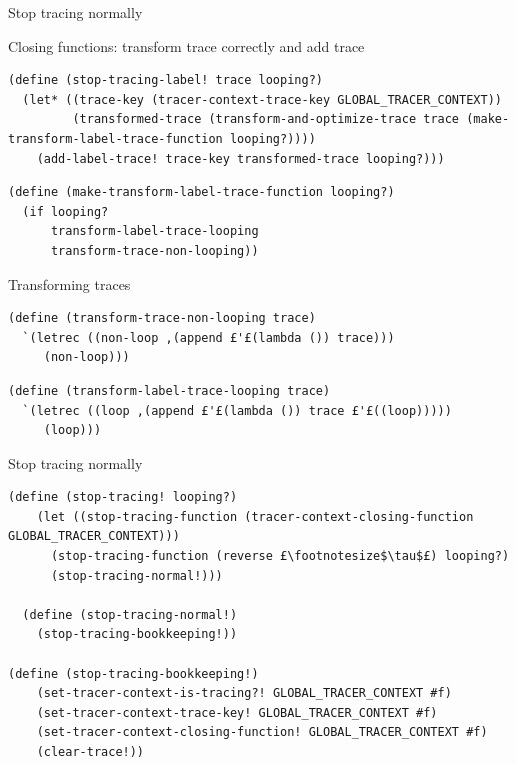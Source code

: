 \documentclass{beamer}
\begin{document}
\begin{frame}[fragile]{Stop tracing normally}

Closing functions: transform trace correctly and add trace

\begin{lstlisting}[basicstyle = \scriptsize\ttfamily, escapechar = £]
(define (stop-tracing-label! trace looping?)
  (let* ((trace-key (tracer-context-trace-key GLOBAL_TRACER_CONTEXT))
         (transformed-trace (transform-and-optimize-trace trace (make-transform-label-trace-function looping?))))
    (add-label-trace! trace-key transformed-trace looping?)))
\end{lstlisting}

\pause

\begin{lstlisting}[basicstyle = \scriptsize\ttfamily, escapechar = £]
(define (make-transform-label-trace-function looping?)
  (if looping?
      transform-label-trace-looping
      transform-trace-non-looping))
\end{lstlisting}
\end{frame}

\begin{frame}[fragile]{Transforming traces}

\begin{lstlisting}[basicstyle = \footnotesize\ttfamily, escapechar = £]
(define (transform-trace-non-looping trace)
  `(letrec ((non-loop ,(append £'£(lambda ()) trace)))
     (non-loop)))
\end{lstlisting}

\begin{lstlisting}[basicstyle = \footnotesize\ttfamily, escapechar = £]
(define (transform-label-trace-looping trace)
  `(letrec ((loop ,(append £'£(lambda ()) trace £'£((loop)))))
     (loop)))
\end{lstlisting}

\end{frame}

\begin{frame}[fragile]{Stop tracing normally}

\begin{lstlisting}[basicstyle = \scriptsize\ttfamily, escapechar = £]
(define (stop-tracing! looping?)
    (let ((stop-tracing-function (tracer-context-closing-function GLOBAL_TRACER_CONTEXT)))
      (stop-tracing-function (reverse £\footnotesize$\tau$£) looping?)
      (stop-tracing-normal!)))
  
  (define (stop-tracing-normal!)
    (stop-tracing-bookkeeping!))
      
(define (stop-tracing-bookkeeping!)
    (set-tracer-context-is-tracing?! GLOBAL_TRACER_CONTEXT #f)
    (set-tracer-context-trace-key! GLOBAL_TRACER_CONTEXT #f)
    (set-tracer-context-closing-function! GLOBAL_TRACER_CONTEXT #f)
    (clear-trace!))
\end{lstlisting}

\end{frame}
\end{document}
